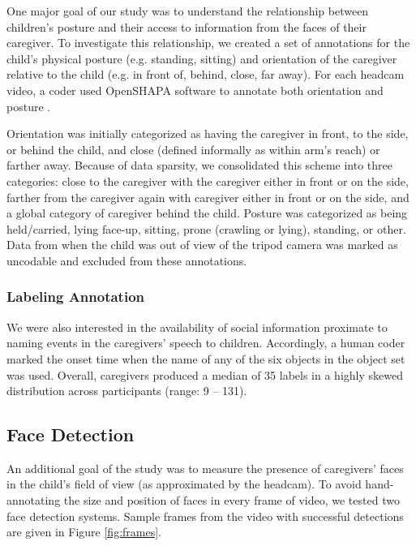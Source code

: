 \documentclass[10pt,letterpaper]{article}
\begin{document}
One major goal of our study was to understand the relationship between children's posture and their access to information from the faces of their caregiver. To investigate this relationship, we created a set of annotations for the child's physical posture (e.g. standing, sitting) and orientation of the caregiver relative to the child (e.g. in front of, behind, close, far away). For each headcam video, a coder used OpenSHAPA software to annotate both orientation and posture \cite{adolph2012}. 

Orientation was initially categorized as having the caregiver in front, to the side, or behind the child, and close (defined informally as within arm's reach) or farther away. Because of data sparsity, we consolidated this scheme into three categories: close to the caregiver with the caregiver either in front or on the side, farther from the caregiver again with caregiver either in front or on the side, and a global category of caregiver behind the child. Posture was categorized as being held/carried, lying face-up, sitting, prone (crawling or lying), standing, or other. Data from when the child was out of view of the tripod camera was marked as uncodable and excluded from these annotations. 

\subsubsection{Labeling Annotation}

We were also interested in the availability of social information proximate to naming events in the caregivers' speech to children. Accordingly, a human coder marked the onset time when the name of any of the six objects in the object set was used. Overall, caregivers produced a median of 35 labels in a highly skewed distribution across participants (range: 9 -- 131).

\subsection{Face Detection}

An additional goal of the study was to measure the presence of caregivers' faces in the child's field of view (as approximated by the headcam). To avoid hand-annotating the size and position of faces in every frame of video, we tested two face detection systems. Sample frames from the video with successful detections are given in Figure \ref{fig:frames}.
\end{document}

